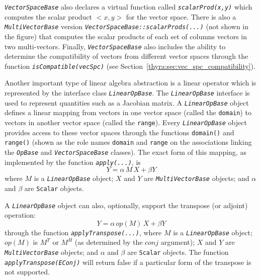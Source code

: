 \documentclass[pdf,ps2pdf,11pt]{SANDreport}
\begin{document}
{}\texttt{\textit{Vector\-Space\-Base}} also declares a virtual function
called {}\texttt{\textit{scalarProd(x,y)}} which computes the scalar product
$<x,y>$ for the vector space.  There is also a
{}\texttt{\textit{Multi\-Vector\-Base}} version
{}\texttt{\textit{Vector\-Space\-Base\-::scalarProds(...)}}  (not shown in the
figure) that computes the scalar products of each set of columns vectors in
two multi-vectors.  Finally, {}\texttt{\textit{Vector\-Space\-Base}} also
includes the ability to determine the compatibility of vectors from different
vector spaces through the function {}\texttt{\textit{isCompatible(vecSpc)}}
(see Section~\ref{thyra:sec:vec_spc_compatibility}).

Another important type of linear algebra abstraction is a linear operator
which is represented by the interface class
{}\texttt{\textit{Linear\-Op\-Base}}.  The
{}\texttt{\textit{Linear\-Op\-Base}} interface is used to represent quantities
such as a Jacobian matrix. A {}\texttt{\textit{Linear\-Op\-Base}} object
defines a linear mapping from vectors in one vector space (called the
{}\texttt{domain}) to vectors in another vector space (called the
{}\texttt{range}).  Every {}\texttt{\textit{Linear\-Op\-Base}} object provides
access to these vector spaces through the functions {}\texttt{domain()} and
{}\texttt{range()} (shown as the role names {}\texttt{domain} and
{}\texttt{range} on the associations linking the {}\texttt{\textit{OpBase}}
and {}\texttt{\textit{Vector\-Space\-Base}} classes).  The exact form of this
mapping, as implemented by the function {}\texttt{\textit{apply(\-...)}}, is
%
\begin{equation}
Y = \alpha \, M \, X + \beta Y
\label{thyra:equ:apply_vec}
\end{equation}
%
where $M$ is a {}\texttt{\textit{Linear\-Op\-Base}} object; $X$ and $Y$ are
{}\texttt{\textit{Multi\-Vector\-Base}} objects; and $\alpha$ and $\beta$ are
{}\texttt{Scalar} objects.

A {}\texttt{\textit{Linear\-Op\-Base}} object can also, optionally, support
the transpose (or adjoint) operation:
%
\begin{equation}
Y = \alpha \, op(M) \, X + \beta Y
\label{thyra:equ:apply_transpose_vec}
\end{equation}
%
through the function {}\texttt{\textit{apply\-Transpose(\-...)}}, where $M$ is
a {}\texttt{\textit{Linear\-Op\-Base}} object; $op(M)$ is $M^T$ or $M^H$ (as
determined by the $conj$ argument); $X$ and $Y$ are
{}\texttt{\textit{Multi\-Vector\-Base}} objects; and $\alpha$ and $\beta$ are
{}\texttt{Scalar} objects.  The function
{}\texttt{\textit{applyTranspose(EConj)}} will return false if a particular
form of the transpose is not supported.
\end{document}
